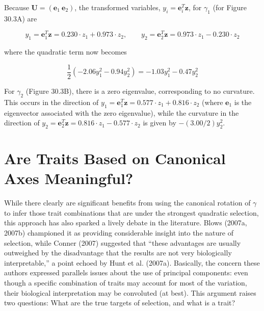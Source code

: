 \documentclass{article}
\begin{document}
Because  $ \mathbf{U} = (\mathbf{e}_1 \mathbf{~e}_2) $, the transformed variables,  $ y_i = \mathbf{e}_i^T \mathbf{z} $, for  $ \gamma_1 $ (for Figure 30.3A) are

\begin{equation}
y_{1}=\mathbf{e}_{1}^{T}\mathbf{z}=0.230\cdot z_{1}+0.973\cdot z_{2},\qquad y_{2}=\mathbf{e}_{2}^{T}\mathbf{z}=0.973\cdot z_{1}-0.230\cdot z_{2}
\end{equation}

where the quadratic term now becomes

\begin{equation}
\frac{1}{2}\left(-2.06y_{1}^{2}-0.94y_{2}^{2}\right)=-1.03y_{1}^{2}-0.47y_{2}^{2}
\end{equation}

For $\gamma_2$ (Figure 30.3B), there is a zero eigenvalue, corresponding to no curvature. This occurs in the direction of $y_1 = \mathbf{e}_1^T \mathbf{z} = 0.577 \cdot z_1 + 0.816 \cdot z_2$ (where $\mathbf{e}_1$ is the eigenvector associated with the zero eigenvalue), while the curvature in the direction of $y_2 = \mathbf{e}_2^T \mathbf{z} = 0.816 \cdot z_1 - 0.577 \cdot z_2$ is given by $-(3.00/2)y_2^2$.

\section{Are Traits Based on Canonical Axes Meaningful?}
While there clearly are significant benefits from using the canonical rotation of  $ \gamma $ to infer those trait combinations that are under the strongest quadratic selection, this approach has also sparked a lively debate in the literature. Blows (2007a, 2007b) championed it as providing considerable insight into the nature of selection, while Conner (2007) suggested that “these advantages are usually outweighed by the disadvantage that the results are not very biologically interpretable,” a point echoed by Hunt et al. (2007a). Basically, the concern these authors expressed parallels issues about the use of principal components: even though a specific combination of traits may account for most of the variation, their biological interpretation may be convoluted (at best). This argument raises two questions: What are the true targets of selection, and what is a trait?
\end{document}
